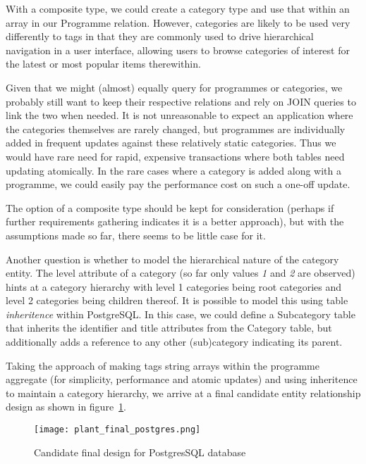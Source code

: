 \documentclass[11pt,a4paper]{article}
\begin{document}
With a composite type, we could create a category type and use that within
an array in our Programme relation. However, categories are likely to be
used very differently to tags in that they are commonly used to
drive hierarchical navigation in a user interface, allowing users
to browse categories of interest for the latest or most popular items
therewithin.

Given that we might (almost) equally query for programmes or categories,
we probably still want to keep their respective relations and rely on
JOIN queries to link the two when needed. It is not unreasonable to
expect an application where the categories themselves are rarely changed,
but programmes are individually added in frequent updates against these
relatively static categories. Thus we would have rare need for rapid,
expensive transactions where both tables need updating atomically. In
the rare cases where a category is added along with a programme,
we could easily pay the performance cost on such a one-off update.

The option of a composite type should be kept for consideration (perhaps
if further requirements gathering indicates it is a better approach),
but with the assumptions made so far, there seems to be little
case for it.

Another question is whether to model the hierarchical nature of the
category entity. The level attribute of a category (so far only values
\emph{1} and \emph{2} are observed) hints at a category hierarchy with
level 1 categories being root categories and level 2 categories being
children thereof. It is possible to model this using table
\emph{inheritence} within PostgreSQL. In this case, we could define
a Subcategory table that inherits the identifier and title attributes
from the Category table, but additionally adds a reference to any
other (sub)category indicating its parent.

Taking the approach of making tags string arrays within the programme
aggregate (for simplicity, performance and atomic updates) and using
inheritence to maintain a category hierarchy, we arrive at a final
candidate entity relationship design as shown in figure~\ref{fig:final_postgres}.

\begin{comment}
  @startuml plant_final_postgres.png
  class Programme {
    pid : varchar
    complete_title : varchar
    media_type : enum ['video, 'audio']
    masterbrand : varchar
    brand_pid : varchar
    is_clip : boolean
    tags : varchar[]
  }
  class AvailabilityWindow {
    start_time : timestamp
    end_time : timestamp
    service : varchar
  }
  class Category {
    id : varchar
    title : varchar
  }
  class Subcategory extends Category {
    parent : Category
  }
  Programme "1" -d- "0..*" AvailabilityWindow
  Programme "0..*" -r- "0..*" Category
  @enduml
\end{comment}
\begin{figure}[p]
  \begin{center}
    \texttt{[image: plant\_final\_postgres.png]}
  \end{center}
  \caption{Candidate final design for PostgresSQL database}
  \label{fig:final_postgres}
\end{figure}
\end{document}
